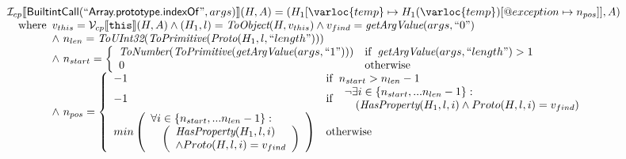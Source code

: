 \[\begin{array}{l}
\I _{cp}\lbr \SF{BuiltintCall}(``\SF{Array.prototype.indexOf}",args)\rbr(H,A)
 = (H_1[\varloc{temp}\mapsto H_1(\varloc{temp})[\varprop{exception}\mapsto n_{pos}]], A) \\
\quad\wherec{
  v_{this} = \V _{cp}\lbr \TT{this}\rbr (H,A) \land (H_1,l) = \hf{ToObject}(H,v_{this})
  \land v_{find} = \hf{getArgValue}(args,``0")\\
  \land\ n_{len} = \hf{ToUInt32}(\hf{ToPrimitive}(\hf{Proto}(H_1, l, ``length")))\\
  \land\ n_{start} = \left\{\begin{array}{ll}
      \hf{ToNumber}(\hf{ToPrimitive}(\hf{getArgValue}(args, ``1")))
      & \ifc{\hf{getArgValue}(args, ``length") > 1}\\
      0 & \owc\\
    \end{array}\right.\\
  \land\ n_{pos} = \left\{\begin{array}{ll}
      -1 & \ifc{n_{start} > n_{len}-1}\\
      -1 & \ifc{\begin{array}{l}
        \neg\exists i \in \{n_{start},...n_{len}-1\}:\\
        \quad(\hf{HasProperty}(H_1,l,i) \land Proto(H,l,i) = v_{find})\end{array}}\\
      min\left(\begin{array}{l}
        \forall i \in \{n_{start},...n_{len}-1\}:\\
        \quad\left(\begin{array}{l}
          \hf{HasProperty}(H_1,l,i)\\
          \land Proto(H,l,i) = v_{find}\end{array}\right)\end{array}\right) & \owc
    \end{array}\right.\\
  }\\
\\\\

\end{array}
\]

